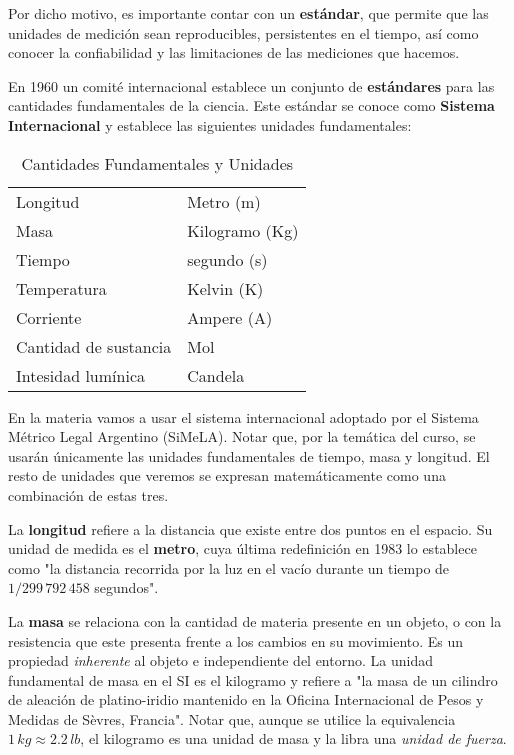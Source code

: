 Por dicho motivo,
es importante contar con un \textbf{estándar},
que permite que las unidades de medición sean reproducibles,
persistentes en el tiempo,
así como conocer la confiabilidad
y las limitaciones de las mediciones que hacemos.

En 1960 un comité internacional establece un conjunto de \textbf{estándares}
para las cantidades fundamentales de la ciencia.
Este estándar se conoce como \textbf{Sistema Internacional}
y establece las siguientes unidades fundamentales:

\vspace{.5cm}
\begin{table}[H]
    \centering
    \caption{Cantidades Fundamentales y Unidades}
    \vspace{.5cm}
    \begin{tabular}{ll}
        \hline
        Longitud              & Metro (m)      \\
        Masa                  & Kilogramo (Kg) \\
        Tiempo                & segundo (s)    \\
        Temperatura           & Kelvin (K)     \\
        Corriente             & Ampere (A)     \\
        Cantidad de sustancia & Mol            \\
        Intesidad lumínica    & Candela        \\
        \hline
    \end{tabular}
\end{table}
\vspace{.5cm}

En la materia vamos a usar el sistema internacional adoptado por el
Sistema Métrico Legal Argentino (SiMeLA).
Notar que,
por la temática del curso,
se usarán únicamente las unidades fundamentales de tiempo, masa y longitud.
El resto de unidades que veremos 
se expresan matemáticamente como una combinación de estas tres.

La \textbf{longitud} refiere a la distancia que existe entre dos puntos en el
espacio.
Su unidad de medida es el \textbf{metro},
cuya última redefinición en 1983 lo establece como
"la distancia recorrida por la luz en el vacío durante un tiempo de
\(1/299\,792\,458\) segundos".

La \textbf{masa} se relaciona con la cantidad de materia presente en un objeto,
o con la resistencia que este presenta frente a los cambios en su movimiento.
Es un propiedad \textit{inherente} al objeto e independiente del entorno.
La unidad fundamental de masa en el SI es el kilogramo
y refiere a "la masa de un cilindro de aleación de platino-iridio mantenido
en la Oficina Internacional de Pesos y Medidas de Sèvres, Francia".
Notar que, aunque se utilice la equivalencia \(1\,kg\approx2.2\,lb\),
el kilogramo es una unidad de masa y la libra una \textit{unidad de fuerza}.

